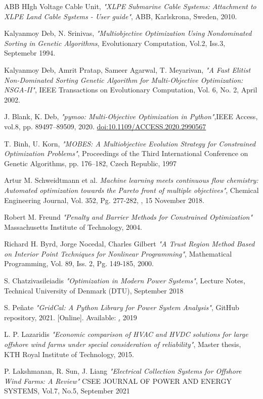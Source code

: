 \documentclass[a4paper,11pt, titlepage, twoside]{article}
\begin{document}
\begin{thebibliography}{99}
{ABB HIgh Voltage Cable Unit},
\textit{"XLPE Submarine Cable Systems: Attachment to XLPE Land Cable Systems - User guide"}, ABB, Karlskrona, Sweden, 2010.

{Kalyanmoy Deb, N. Srinivas},
\textit{"Multiobjective Optimization Using Nondominated Sorting in Genetic Algorithms}, Evolutionary Computation, Vol.2, Iss.3, Septemebr 1994.

{Kalyanmoy Deb, Amrit Pratap, Sameer Agarwal, T. Meyarivan},
\textit{"A Fast Elitist Non-Dominated Sorting Genetic Algorithm for Multi-Objective Optimization: NSGA-II"}, IEEE Transactions on Evolutionary Computation, Vol. 6, No. 2, April 2002.

{J. Blank, K. Deb},
\textit{"pymoo: Multi-Objective Optimization in Python"},IEEE Access, vol.8, pp. 89497–89509, 2020. \href{https://ieeexplore.ieee.org/document/9078759}{doi:10.1109/ACCESS.2020.2990567}

{T. Binh, U. Korn},
\textit{"MOBES: A Multiobjective Evolution Strategy for Constrained Optimization Problems"}, Proceedings of the Third International Conference on Genetic Algorithms, 
pp. 176–182, Czech Republic, 1997

{Artur M. Schweidtmann et al.}
\textit{Machine learning meets continuous flow chemistry: Automated
optimization towards the Pareto front of multiple objectives"}, Chemical Engineering Journal, Vol. 352, Pg. 277-282, , 15 November 2018.

{Robert M. Freund}
\textit{"Penalty and Barrier Methods for Constrained Optimization"} Massachusetts Institute of Technology, 2004.

{Richard H. Byrd, Jorge Nocedal, Charles Gilbert}
\textit{"A Trust Region Method Based on Interior Point Techniques for Nonlinear Programming"}, Mathematical Programming, Vol. 89, Iss. 2, Pg. 149-185, 2000.
 

{S. Chatzivasileiadis}
\textit{"Optimization in Modern Power Systems"}, Lecture Notes, Technical University of Denmark (DTU), September 2018

{S. Peñate}
\textit{"GridCal: A Python Library for Power System Analysis"}, GitHub repository, 2021. [Online]. Available: \href{https://github.com/SanPen/GridCal}, 2019

{L. P. Lazaridis}
\textit{"Economic comparison of HVAC and HVDC solutions for large offshore wind farms under special consideration of reliability"}, Master thesis, KTH Royal Institute of Technology, 2015.

{P. Lakshmanan, R. Sun, J. Liang}
\textit{"Electrical Collection Systems for Offshore Wind
Farms: A Review"} CSEE JOURNAL OF POWER AND ENERGY SYSTEMS, Vol.7, No.5, September 2021














\end{thebibliography}
\end{document}
